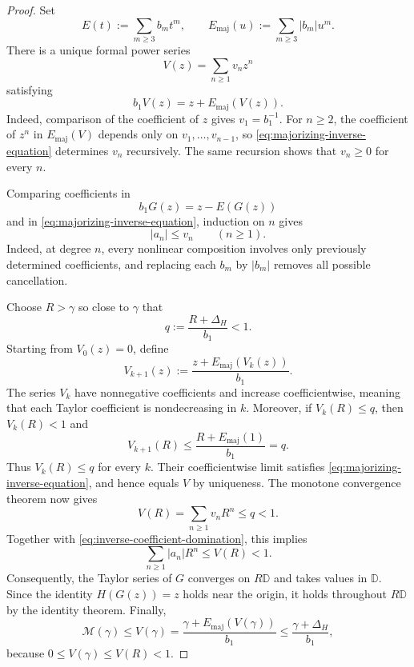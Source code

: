 \begin{proof}
Set
\[
  E(t):=\sum_{m\ge3}b_mt^m,
  \qquad
  E_{\mathrm{maj}}(u):=\sum_{m\ge3}|b_m|u^m.
\]
There is a unique formal power series
\[
  V(z)=\sum_{n\ge1}v_nz^n
\]
satisfying
\begin{equation}
  b_1V(z)=z+E_{\mathrm{maj}}(V(z)).
  \label{eq:majorizing-inverse-equation}
\end{equation}
Indeed, comparison of the coefficient of $z$ gives $v_1=b_1^{-1}$.  For
$n\ge2$, the coefficient of $z^n$ in $E_{\mathrm{maj}}(V)$ depends only on
$v_1,\ldots,v_{n-1}$, so \eqref{eq:majorizing-inverse-equation} determines
$v_n$ recursively.  The same recursion shows that $v_n\ge0$ for every $n$.

Comparing coefficients in
\[
  b_1G(z)=z-E(G(z))
\]
and in \eqref{eq:majorizing-inverse-equation}, induction on $n$ gives
\begin{equation}
  |a_n|\le v_n
  \qquad(n\ge1).
  \label{eq:inverse-coefficient-domination}
\end{equation}
Indeed, at degree $n$, every nonlinear composition involves only previously
determined coefficients, and replacing each $b_m$ by $|b_m|$ removes all
possible cancellation.

Choose $R>\gamma$ so close to $\gamma$ that
\[
  q:=\frac{R+\Delta_H}{b_1}<1.
\]
Starting from $V_0(z)=0$, define
\begin{equation}
  V_{k+1}(z):=\frac{z+E_{\mathrm{maj}}(V_k(z))}{b_1}.
  \label{eq:majorizing-inverse-iteration}
\end{equation}
The series $V_k$ have nonnegative coefficients and increase coefficientwise,
meaning that each Taylor coefficient is nondecreasing in $k$.
Moreover, if $V_k(R)\le q$, then $V_k(R)<1$ and
\[
  V_{k+1}(R)
  \le \frac{R+E_{\mathrm{maj}}(1)}{b_1}
  =q.
\]
Thus $V_k(R)\le q$ for every $k$.  Their coefficientwise limit satisfies
\eqref{eq:majorizing-inverse-equation}, and hence equals $V$ by uniqueness.
The monotone convergence theorem now gives
\[
  V(R)=\sum_{n\ge1}v_nR^n\le q<1.
\]
Together with \eqref{eq:inverse-coefficient-domination}, this implies
\[
  \sum_{n\ge1}|a_n|R^n\le V(R)<1.
\]
Consequently, the Taylor series of $G$ converges on $R\mathbb D$ and takes
values in $\mathbb D$.  Since the identity $H(G(z))=z$ holds near the origin,
it holds throughout $R\mathbb D$ by the identity theorem.  Finally,
\[
  \mathcal M(\gamma)
  \le V(\gamma)
  =\frac{\gamma+E_{\mathrm{maj}}(V(\gamma))}{b_1}
  \le\frac{\gamma+\Delta_H}{b_1},
\]
because $0\le V(\gamma)\le V(R)<1$.
\end{proof}


